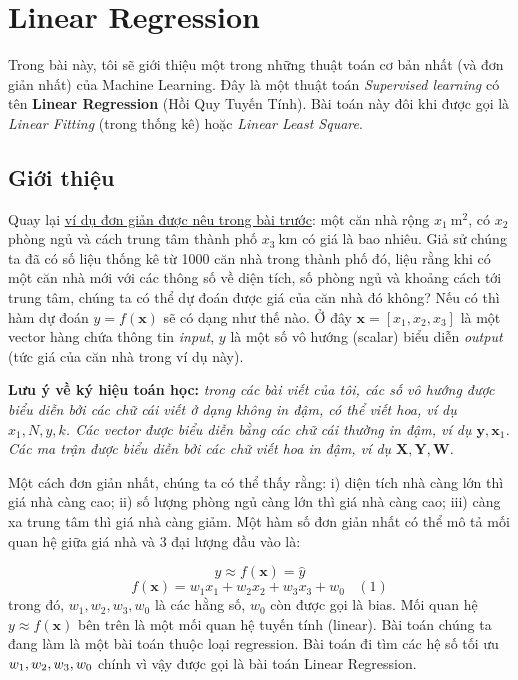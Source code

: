 \chapter{Linear Regression }

 
Trong bài này, tôi sẽ giới thiệu một trong những thuật toán cơ bản nhất (và đơn giản nhất) của Machine Learning. Đây là một thuật toán \textit{Supervised learning} có tên \textbf{Linear Regression} (Hồi Quy Tuyến Tính). Bài toán này đôi khi được gọi là \textit{Linear Fitting} (trong thống kê) hoặc \textit{Linear Least Square}. 

\section{Giới thiệu}
 
Quay lại \href{http://machinelearningcoban.com/2016/12/27/categories/#regression-hoi-quy}{ví dụ đơn giản được nêu trong bài trước}: một căn nhà rộng $x_1 ~ \text{m}^2$, có $x_2$ phòng ngủ và cách trung tâm thành phố $x_3~ \text{km}$ có giá là bao nhiêu. Giả sử chúng ta đã có số liệu thống kê từ 1000 căn nhà trong thành phố đó, liệu rằng khi có một căn nhà mới với các thông số về diện tích, số phòng ngủ và khoảng cách tới trung tâm, chúng ta có thể dự đoán được giá của căn nhà đó không? Nếu có thì hàm dự đoán $y = f(\mathbf{x}) $ sẽ có dạng như thế nào. Ở đây $\mathbf{x} = [x_1, x_2, x_3] $ là một vector hàng chứa thông tin \textit{input}, $y$ là một số vô hướng (scalar) biểu diễn \textit{output} (tức giá của căn nhà trong ví dụ này). 
 
\textbf{Lưu ý về ký hiệu toán học:} \textit{trong các bài viết của tôi, các số vô hướng được biểu diễn bởi các chữ cái viết ở dạng không in đậm, có thể viết hoa, ví dụ $x_1, N, y, k$. Các vector được biểu diễn bằng các chữ cái thường in đậm, ví dụ $\mathbf{y}, \mathbf{x}_1 $. Các ma trận được biểu diễn bởi các chữ viết hoa in đậm, ví dụ $\mathbf{X, Y, W} $.} 
 
Một cách đơn giản nhất, chúng ta có thể thấy rằng: i) diện tích nhà càng lớn thì giá nhà càng cao; ii) số lượng phòng ngủ càng lớn thì giá nhà càng cao; iii) càng xa trung tâm thì giá nhà càng giảm. Một hàm số đơn giản nhất có thể mô tả mối quan hệ giữa giá nhà và 3 đại lượng đầu vào là:  
 
 
$$y \approx  f(\mathbf{x}) = \hat{y}$$ 
$$f(\mathbf{x}) =w_1 x_1 + w_2 x_2 + w_3 x_3 + w_0 ~~~~ (1)$$ 
trong đó, $w_1, w_2, w_3, w_0$ là các hằng số,  $w_0$ còn được gọi là bias. Mối quan hệ $y \approx f(\mathbf{x})$ bên trên là một mối quan hệ tuyến tính (linear). Bài toán chúng ta đang làm là một bài toán thuộc loại regression. Bài toán đi tìm các hệ số tối ưu $ \\{w_1, w_2, w_3, w_0 \\}$ chính vì vậy được gọi là bài toán Linear Regression.  
 
